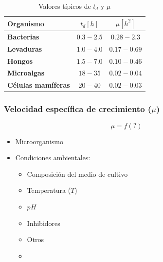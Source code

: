         \begin{table}[H]
            \begin{tabular}{|lcc|}
                \hline
                \rowcolor[HTML]{C0C0C0} 
                \textbf{Organismo}         & \(t_{d} [h]\) & \(\mu [h^{2}]\) \\ \hline
                \rowcolor[HTML]{EFEFEF} 
                \textbf{Bacterias}         & \(0.3-2.5\)   & \(0.28-2.3\)    \\
                \textbf{Levaduras}         & \(1.0-4.0\)   & \(0.17-0.69\)   \\
                \rowcolor[HTML]{EFEFEF} 
                \textbf{Hongos}            & \(1.5-7.0\)   & \(0.10-0.46\)   \\
                \textbf{Microalgas}        & \(18-35\)     & \(0.02-0.04\)   \\
                \rowcolor[HTML]{EFEFEF} 
                \textbf{Células mamíferas} & \(20-40\)     & \(0.02-0.03\)   \\ \hline
            \end{tabular}
            \caption{Valores típicos de \(t_{d}\) y \(\mu\)}
            \label{tab:valores_t_d_mu}
        \end{table}
        
        \subsubsection{Velocidad específica de crecimiento (\(\mu\))}
        
        \[\mu = f(?)\]
        
        \begin{itemize}
            \item Microorganismo
            \item Condiciones ambientales:
                \begin{multicols}{2}
                    \begin{itemize}
                        \item Composición del medio de cultivo
                        \item Temperatura (\(T\))
                        \item \(pH\)
                        \item Inhibidores
                        \item Otros
                        \item []
                    \end{itemize}
                \end{multicols}
        \end{itemize}
        
